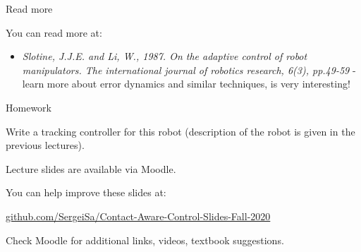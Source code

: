 \documentclass{beamer}
\begin{document}
\begin{frame}{Read more}
\begin{flushleft}

You can read more at:

\begin{itemize}
    \item \emph{Slotine, J.J.E. and Li, W., 1987. On the adaptive control of robot manipulators. The international journal of robotics research, 6(3), pp.49-59} - learn more about error dynamics and similar techniques, is very interesting!
\end{itemize}

\end{flushleft}
\end{frame}


\begin{frame}{Homework}
\begin{flushleft}

Write a tracking controller for this robot (description of the robot is given in the previous lectures).

\begin{figure}
    \centering
    
\end{figure}

\end{flushleft}
\end{frame}



\begin{frame}
\centerline{Lecture slides are available via Moodle.}
\bigskip
\centerline{You can help improve these slides at:}
\centerline{\href{https://github.com/SergeiSa/Contact-Aware-Control-Slides-Fall-2020}{github.com/SergeiSa/Contact-Aware-Control-Slides-Fall-2020}}
\bigskip
\centerline{Check Moodle for additional links, videos, textbook suggestions.}
\end{frame}
\end{document}
